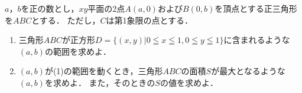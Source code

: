 \documentclass[../../main.tex]{subfiles}
\begin{document}
$a$，$b$を正の数とし，$xy$平面の2点$A(a,0)$および$B(0,b)$を頂点とする正三角形を$ABC$とする．
ただし，$C$は第1象限の点とする．
\begin{enumerate}
  \item 三角形$ABC$が正方形$D=\{(x,y)|0 \leqq x \leqq 1,0 \leqq y \leqq 1\}$に含まれるような$(a,b)$の範囲を求めよ．
  \item $(a,b)$が(1)の範囲を動くとき，三角形$ABC$の面積$S$が最大となるような$(a,b)$を求めよ．
    また，そのときの$S$の値を求めよ．
\end{enumerate}
\end{document}
